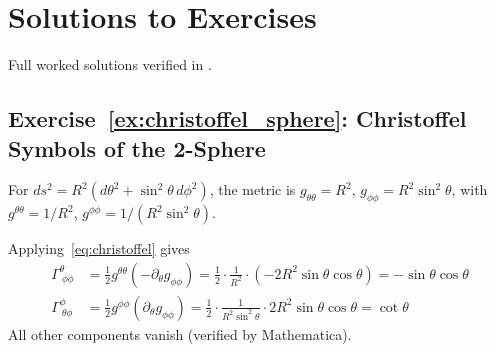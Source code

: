 
\section{Solutions to Exercises}
\label{sec:dg_solutions}

\noindent
Full worked solutions verified in
.

\subsection*{Exercise~\ref{ex:christoffel_sphere}: Christoffel Symbols of the 2-Sphere}

For $ds^2 = R^2(d\theta^2 + \sin^2\theta\, d\phi^2)$, the metric is
$g_{\theta\theta} = R^2$, $g_{\phi\phi} = R^2\sin^2\theta$, with
$g^{\theta\theta} = 1/R^2$, $g^{\phi\phi} = 1/(R^2\sin^2\theta)$.

Applying~\eqref{eq:christoffel} gives
\begin{align*}
    \Gamma^\theta_{\ \phi\phi}
    &= \frac{1}{2} g^{\theta\theta}(-\partial_\theta g_{\phi\phi})
    = \frac{1}{2} \cdot \frac{1}{R^2} \cdot (-2R^2\sin\theta\cos\theta)
    = -\sin\theta\cos\theta \\
    \Gamma^\phi_{\ \theta\phi}
    &= \frac{1}{2} g^{\phi\phi}(\partial_\theta g_{\phi\phi})
    = \frac{1}{2} \cdot \frac{1}{R^2\sin^2\theta} \cdot 2R^2\sin\theta\cos\theta
    = \cot\theta
\end{align*}
All other components vanish (verified by Mathematica).

